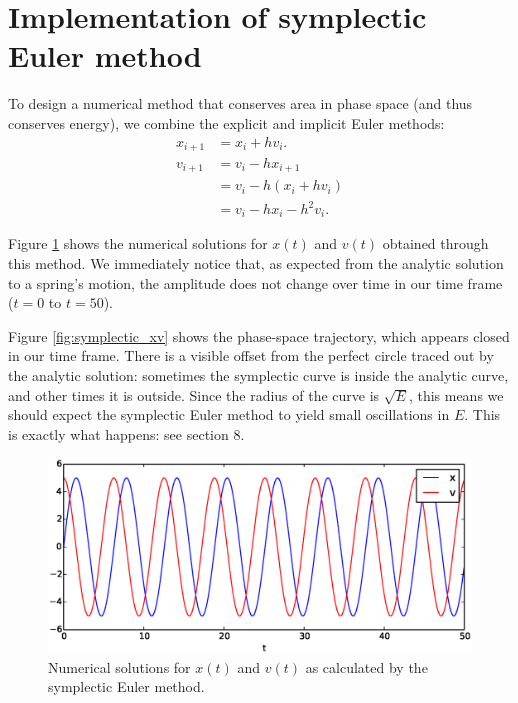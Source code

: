 \documentclass{article}
\theoremstyle{definition}
\renewcommand{\>}{\rangle}
\newcommand{\<}{\langle}
\begin{document}
\section{Implementation of symplectic Euler method}

To design a numerical method that conserves area in phase space (and thus conserves
energy), we combine the
explicit and implicit Euler methods:
\begin{align*}
x_{i+1} &= x_i + hv_i. \\
v_{i+1} &= v_i - hx_{i+1} \\
&= v_i - h(x_i + hv_i) \\
&= v_i - hx_i -h^2v_i.
\end{align*}

Figure \ref{fig:symplectic} shows the numerical solutions for $x(t)$ and $v(t)$ obtained
through this method. We immediately notice that, as expected from the analytic solution
to a spring's motion, the amplitude does not change over time in our time frame ($t=0$
to $t=50$).

Figure \ref{fig:symplectic_xv} shows the phase-space trajectory, which appears closed
in our time frame. There is a visible offset from the perfect circle traced out
by the analytic solution: sometimes the symplectic curve is inside the analytic curve,
and other times it is outside. Since the radius of the
curve is $\sqrt{E}$, this means we should expect the symplectic Euler method to yield
small oscillations in $E$. This is exactly what happens: see section 8.

\begin{figure}
\includegraphics[width=\textwidth]{symplectic.eps}
\caption{\label{fig:symplectic} Numerical solutions for $x(t)$ and $v(t)$ as calculated
by the symplectic Euler method.}
\end{figure}
\end{document}
